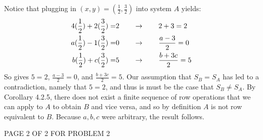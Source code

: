 \documentclass[12pt]{article}
\newenvironment{problem}[2][Problem]
{
	\begin{trivlist} 
		\item[\hskip \labelsep {\bfseries #1 #2:}]
	}
{
	\end{trivlist}
	}
\newenvironment{solution}[1][Solution]
{
	\begin{trivlist} 
		\item[\hskip \labelsep {\itshape #1:}]
	}
	{
	\end{trivlist}
}
\begin{document}
\begin{problem}{3}
\begin{solution}
\end{solution}
%
%
%
%
\newpage
Notice that plugging in $(x,y)=(\frac{1}{2},\frac{3}{2})$ into system $A$ yields:
\begin{align}
4(\frac{1}{2}) + 2(\frac{3}{2}) =& 2 \hphantom{1000} \rightarrow \hphantom{1000} 2+3=2\\
a(\frac{1}{2}) - 1(\frac{3}{2}) =& 0 \hphantom{1000} \rightarrow \hphantom{1000} \frac{a-3}{2} = 0\\
b(\frac{1}{2}) + c(\frac{3}{2}) =& 5 \hphantom{1000} \rightarrow \hphantom{1000} \frac{b+3c}{2}=5
\end{align}
So gives $5=2$, $\frac{a-3}{2} = 0$, and $\frac{b+3c}{2}=5$. Our assumption that $S_B = S_A$ has led to a contradiction, namely that $5=2$, and thus is must be the case that $S_B \neq S_A$. By Corollary 4.2.5, there does not exist a finite sequence of row operations that we can apply to $A$ to obtain $B$ and vice versa, and so by definition $A$ is not row equivalent to $B$. Because $a,b,c$ were arbitrary, the result follows.
\vfill
\centerline{PAGE 2 OF 2 FOR PROBLEM 2}
\end{problem}
\end{document}
